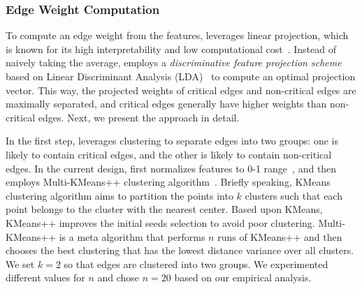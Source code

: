 \subsubsection{Edge Weight Computation}
\label{subsubsec:weight-computation}


To compute an edge weight from the features, \tool leverages linear projection, which is known for its high interpretability and low computational cost~\cite{friedman2001elements}.
Instead of naively taking the average,
\tool employs a \emph{discriminative feature projection scheme} based on Linear Discriminant Analysis (LDA)~\cite{Mika99fisherdiscriminant} to compute an optimal projection vector.
This way, the projected weights of critical edges and non-critical edges are maximally separated, and critical edges generally have higher weights than non-critical edges.
%
Next, we present the approach in detail.


In the first step, \tool leverages clustering to separate edges into two groups: one is likely to contain critical edges, and the other is likely to contain non-critical edges.
%
%
In the current design, \tool first normalizes features to 0-1 range~\cite{friedman2001elements}, and then employs Multi-KMeans++ clustering algorithm~\cite{Arthur:2007:KAC:1283383.1283494}.
Briefly speaking, KMeans clustering algorithm aims to partition the points into $k$ clusters such that each point belongs to the cluster with the nearest center.
Based upon KMeans, KMeans++ improves the initial seeds selection to avoid poor clustering.
Multi-KMeans++ is a meta algorithm that performs $n$ runs of KMeans++ and then chooses the best clustering that has the lowest distance variance over all clusters.
We set $k=2$ so that edges are clustered into two groups.
We experimented different values for $n$ and chose $n=20$ based on our empirical analysis.  



